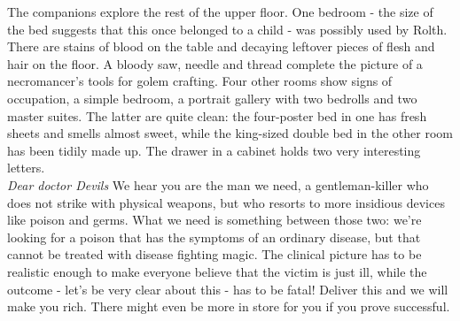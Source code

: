 The companions explore the rest of the upper floor. One bedroom - the size of the bed suggests that this once belonged to a child - was possibly used by Rolth. There are stains of blood on the table and decaying leftover pieces of flesh and hair on the floor. A bloody saw, needle and thread complete the picture of a necromancer's tools for golem crafting. Four other rooms show signs of occupation, a simple bedroom, a portrait gallery with two bedrolls and two master suites. The latter are quite clean: the four-poster bed in one has fresh sheets and smells almost sweet, while the king-sized double bed in the other room has been tidily made up. The drawer in a cabinet holds two very interesting letters.\\

 {\itshape Dear doctor Devils}  We hear you are the man we need, a gentleman-killer who does not strike with physical weapons, but who resorts to more insidious devices like poison and germs. What we need is something between those two: we're looking for a poison that has the symptoms of an ordinary disease, but that cannot be treated with disease fighting magic. The clinical picture has to be realistic enough to make everyone believe that the victim is just ill, while the outcome - let's be very clear about this - has to be fatal! Deliver this and we will make you rich. There might even be more in store for you if you prove successful.\\

